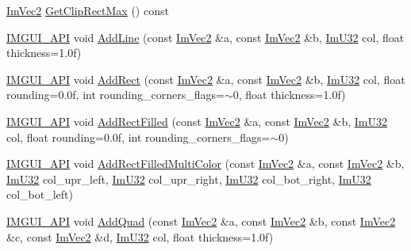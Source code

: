 \begin{DoxyCompactItemize}
\item 
\mbox{\hyperlink{struct_im_vec2}{Im\+Vec2}} \mbox{\hyperlink{struct_im_draw_list_a8e484a61eab501c1c1c416a8b45bb08e}{Get\+Clip\+Rect\+Max}} () const
\item 
\mbox{\hyperlink{imgui_8h_a43829975e84e45d1149597467a14bbf5}{I\+M\+G\+U\+I\+\_\+\+A\+PI}} void \mbox{\hyperlink{struct_im_draw_list_a6db76ca2506dc86ad4d602fdcd2e2ea8}{Add\+Line}} (const \mbox{\hyperlink{struct_im_vec2}{Im\+Vec2}} \&a, const \mbox{\hyperlink{struct_im_vec2}{Im\+Vec2}} \&b, \mbox{\hyperlink{imgui_8h_a118cff4eeb8d00e7d07ce3d6460eed36}{Im\+U32}} col, float thickness=1.\+0f)
\item 
\mbox{\hyperlink{imgui_8h_a43829975e84e45d1149597467a14bbf5}{I\+M\+G\+U\+I\+\_\+\+A\+PI}} void \mbox{\hyperlink{struct_im_draw_list_a6738c7d0b696273a37808554e1f15a0a}{Add\+Rect}} (const \mbox{\hyperlink{struct_im_vec2}{Im\+Vec2}} \&a, const \mbox{\hyperlink{struct_im_vec2}{Im\+Vec2}} \&b, \mbox{\hyperlink{imgui_8h_a118cff4eeb8d00e7d07ce3d6460eed36}{Im\+U32}} col, float rounding=0.\+0f, int rounding\+\_\+corners\+\_\+flags=$\sim$0, float thickness=1.\+0f)
\item 
\mbox{\hyperlink{imgui_8h_a43829975e84e45d1149597467a14bbf5}{I\+M\+G\+U\+I\+\_\+\+A\+PI}} void \mbox{\hyperlink{struct_im_draw_list_a1fa7c9165958909bba53c9740a607872}{Add\+Rect\+Filled}} (const \mbox{\hyperlink{struct_im_vec2}{Im\+Vec2}} \&a, const \mbox{\hyperlink{struct_im_vec2}{Im\+Vec2}} \&b, \mbox{\hyperlink{imgui_8h_a118cff4eeb8d00e7d07ce3d6460eed36}{Im\+U32}} col, float rounding=0.\+0f, int rounding\+\_\+corners\+\_\+flags=$\sim$0)
\item 
\mbox{\hyperlink{imgui_8h_a43829975e84e45d1149597467a14bbf5}{I\+M\+G\+U\+I\+\_\+\+A\+PI}} void \mbox{\hyperlink{struct_im_draw_list_ab658e574f3ef67a8d6cc0a86f13f5176}{Add\+Rect\+Filled\+Multi\+Color}} (const \mbox{\hyperlink{struct_im_vec2}{Im\+Vec2}} \&a, const \mbox{\hyperlink{struct_im_vec2}{Im\+Vec2}} \&b, \mbox{\hyperlink{imgui_8h_a118cff4eeb8d00e7d07ce3d6460eed36}{Im\+U32}} col\+\_\+upr\+\_\+left, \mbox{\hyperlink{imgui_8h_a118cff4eeb8d00e7d07ce3d6460eed36}{Im\+U32}} col\+\_\+upr\+\_\+right, \mbox{\hyperlink{imgui_8h_a118cff4eeb8d00e7d07ce3d6460eed36}{Im\+U32}} col\+\_\+bot\+\_\+right, \mbox{\hyperlink{imgui_8h_a118cff4eeb8d00e7d07ce3d6460eed36}{Im\+U32}} col\+\_\+bot\+\_\+left)
\item 
\mbox{\hyperlink{imgui_8h_a43829975e84e45d1149597467a14bbf5}{I\+M\+G\+U\+I\+\_\+\+A\+PI}} void \mbox{\hyperlink{struct_im_draw_list_ac3fd62862000b2a7a4e7f61da0a4e3fd}{Add\+Quad}} (const \mbox{\hyperlink{struct_im_vec2}{Im\+Vec2}} \&a, const \mbox{\hyperlink{struct_im_vec2}{Im\+Vec2}} \&b, const \mbox{\hyperlink{struct_im_vec2}{Im\+Vec2}} \&c, const \mbox{\hyperlink{struct_im_vec2}{Im\+Vec2}} \&d, \mbox{\hyperlink{imgui_8h_a118cff4eeb8d00e7d07ce3d6460eed36}{Im\+U32}} col, float thickness=1.\+0f)

\end{DoxyCompactItemize}
